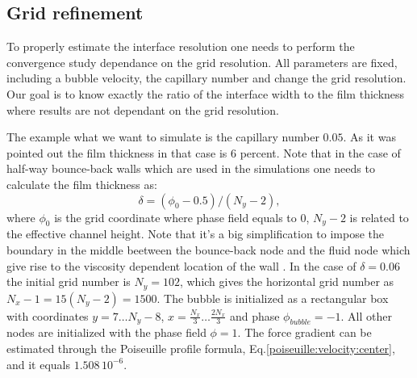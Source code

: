\documentclass{article}
\begin{document}
\subsection{Grid refinement}
To properly estimate the interface resolution one needs to perform the
convergence study dependance on the grid resolution. All parameters are fixed,
including a bubble velocity, the capillary number and change the grid
resolution. Our goal is to know exactly the ratio of the interface width to the
film thickness where results are not dependant on the grid resolution. 

The example what we want to simulate is the capillary number
$0.05$. As it was pointed out the film thickness in that case is $6$ percent.
Note that in the case of half-way bounce-back walls which are used in the
simulations one needs to calculate the film thickness as: 
\begin{equation}
\delta=(\phi_0-0.5)/(N_y-2),
\end{equation}
where $\phi_0$ is the grid coordinate where phase field equals to $0$, $N_y-2$
is related to the effective channel height. Note that it's a big
simplification to impose the boundary in the middle beetween the bounce-back
node and the fluid node which give rise to the viscosity dependent location of
the wall \cite{ginzburg-multireflection}. In the case of $\delta=0.06$ the
initial grid number
is $N_y=102$, which gives the horizontal grid number as $N_x-1=15(N_y-2)=1500$.
The bubble is initialized as a rectangular box with coordinates
$y=7\dots N_y-8$, $x=\frac{N_x}{3}\dots \frac{2 N_x}{3}$ and phase
$\phi_{bubble}=-1$. All other nodes are initialized with the phase field
$\phi=1$. The force gradient can be estimated through the Poiseuille
profile formula, Eq.\ref{poiseuille:velocity:center}, and it equals
$1.508\,10^{-6}$.
\end{document}
